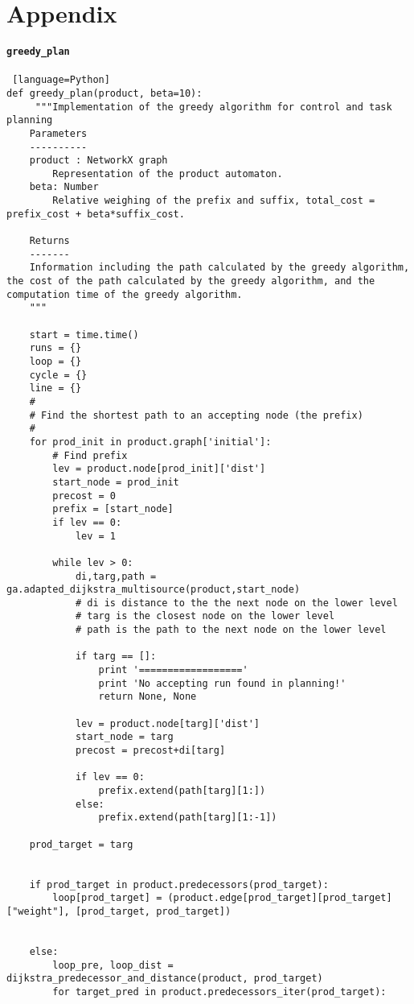\chapter{Appendix}
\begingroup
\fontsize{9pt}{12pt}\selectfont

\subsubsection*{\texttt{greedy\_plan}}
\begin{lstlisting} [language=Python]
def greedy_plan(product, beta=10):
	 """Implementation of the greedy algorithm for control and task planning
    Parameters
    ----------
    product : NetworkX graph 
    	Representation of the product automaton.
    beta: Number
    	Relative weighing of the prefix and suffix, total_cost = prefix_cost + beta*suffix_cost.
    
    Returns
    -------
    Information including the path calculated by the greedy algorithm, the cost of the path calculated by the greedy algorithm, and the computation time of the greedy algorithm.
    """	

	start = time.time()
	runs = {}
	loop = {}
	cycle = {}
	line = {}
	# 
	# Find the shortest path to an accepting node (the prefix)
	#
	for prod_init in product.graph['initial']:
		# Find prefix
		lev = product.node[prod_init]['dist']
		start_node = prod_init
		precost = 0
		prefix = [start_node]
		if lev == 0:
			lev = 1
		
		while lev > 0:						
			di,targ,path = ga.adapted_dijkstra_multisource(product,start_node)
			# di is distance to the the next node on the lower level
			# targ is the closest node on the lower level
			# path is the path to the next node on the lower level
			
			if targ == []:
				print '=================='        
				print 'No accepting run found in planning!'
				return None, None

			lev = product.node[targ]['dist']			
			start_node = targ
			precost = precost+di[targ]

			if lev == 0:				
				prefix.extend(path[targ][1:])
			else:
				prefix.extend(path[targ][1:-1])

	prod_target = targ

	
	if prod_target in product.predecessors(prod_target):
		loop[prod_target] = (product.edge[prod_target][prod_target]["weight"], [prod_target, prod_target])

		
   	else:
		loop_pre, loop_dist = dijkstra_predecessor_and_distance(product, prod_target)
		for target_pred in product.predecessors_iter(prod_target):


\end{lstlisting}
